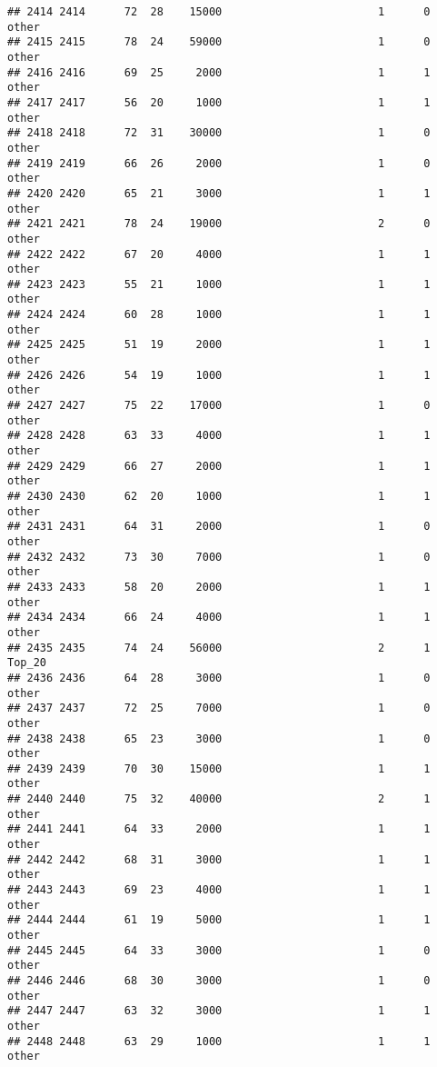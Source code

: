 \documentclass[
]{article}
\begin{document}
\begin{verbatim}
## 2414 2414      72  28    15000                        1      0    other
## 2415 2415      78  24    59000                        1      0    other
## 2416 2416      69  25     2000                        1      1    other
## 2417 2417      56  20     1000                        1      1    other
## 2418 2418      72  31    30000                        1      0    other
## 2419 2419      66  26     2000                        1      0    other
## 2420 2420      65  21     3000                        1      1    other
## 2421 2421      78  24    19000                        2      0    other
## 2422 2422      67  20     4000                        1      1    other
## 2423 2423      55  21     1000                        1      1    other
## 2424 2424      60  28     1000                        1      1    other
## 2425 2425      51  19     2000                        1      1    other
## 2426 2426      54  19     1000                        1      1    other
## 2427 2427      75  22    17000                        1      0    other
## 2428 2428      63  33     4000                        1      1    other
## 2429 2429      66  27     2000                        1      1    other
## 2430 2430      62  20     1000                        1      1    other
## 2431 2431      64  31     2000                        1      0    other
## 2432 2432      73  30     7000                        1      0    other
## 2433 2433      58  20     2000                        1      1    other
## 2434 2434      66  24     4000                        1      1    other
## 2435 2435      74  24    56000                        2      1   Top_20
## 2436 2436      64  28     3000                        1      0    other
## 2437 2437      72  25     7000                        1      0    other
## 2438 2438      65  23     3000                        1      0    other
## 2439 2439      70  30    15000                        1      1    other
## 2440 2440      75  32    40000                        2      1    other
## 2441 2441      64  33     2000                        1      1    other
## 2442 2442      68  31     3000                        1      1    other
## 2443 2443      69  23     4000                        1      1    other
## 2444 2444      61  19     5000                        1      1    other
## 2445 2445      64  33     3000                        1      0    other
## 2446 2446      68  30     3000                        1      0    other
## 2447 2447      63  32     3000                        1      1    other
## 2448 2448      63  29     1000                        1      1    other

\end{verbatim}
\end{document}
